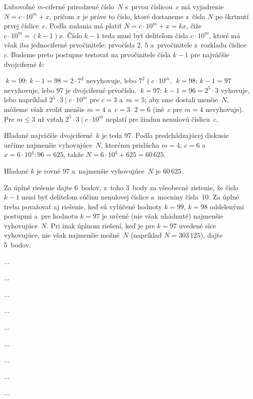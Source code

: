 {%
Ľubovoľné $m$-ciferné prirodzené číslo~$N$ s~prvou číslicou~$c$
má vyjadrenie $N=c\cdot10^m+x$, pričom $x$ je práve to číslo, ktoré
dostaneme z~čísla $N$ po škrtnutí prvej číslice~$c$.
Podľa zadania má platiť
$N=c\cdot10^m+x=kx$, čiže $c\cdot10^m=(k-1)x$. Číslo $k-1$
teda musí byť deliteľom čísla $c\cdot10^m$,
ktoré má však iba jednociferné prvočinitele: prvočísla
2, 5 a~prvočinitele z~rozkladu číslice~$c$.
Budeme preto postupne testovať na prvočinitele čísla $k-1$ pre
najväčšie dvojciferné $k$:

$k=99$: $k-1=98=2\cdot7^2$ nevyhovuje, lebo
 $7^2\nmid c\cdot10^m$.
$k=98$: $k-1=97$ nevyhovuje,
 lebo $97$ je dvojciferné prvočíslo.
$k=97$: $k-1=96=2^5\cdot3$ vyhovuje, lebo napríklad
 $2^5\cdot3\mid c\cdot10^m$ pre $c=3$ a~$m=5$; aby sme dostali
menšie~$N$, môžeme však zvoliť menšie $m=4$ a~$c=3\cdot2=6$
(iné~$c$ pre $m=4$ nevyhovuje). Pre $m\le3$ už vzťah
$2^5\cdot3\mid c\cdot10^m$ neplatí pre žiadnu nenulovú číslicu~$c$.

Hľadané najväčšie dvojciferné~$k$ je teda $97$. Podľa predchádzajúcej
diskusie určíme najmenšie vyhovujúce~$N$, ktorému prislúcha $m=4$,
$c=6$ a~$x=6\cdot10^{4}:96=625$, takže $N=6\cdot10^4+625=60\,625$.

\odpoved
Hľadané $k$ je rovné $97$ a~najmenšie vyhovujúce~$N$ je $60\,625$.

\nobreak\medskip\petit\noindent
Za úplné riešenie dajte 6~bodov, z~toho
3~body za všeobecné zistenie,
že číslo $k-1$ musí byť deliteľom súčinu nenulovej číslice
a~mocniny čísla~10. Za úplné treba považovať
aj riešenie, keď sú vylúčené hodnoty $k=99$, $k=98$ oddelenými
postupmi a~pre hodnotu $k=97$ je určené (nie však uhádnuté)
najmenšie vyhovujúce~$N$. Pri inak úplnom riešení,
keď je pre $k=97$ uvedené síce vyhovujúce,
nie však najmenšie možné~$N$ (napríklad $N=303\,125$), dajte
5~bodov.
\endpetit
\bigbreak
}

{%
...}

{%
...}

{%
...}

{%
...}

{%
...}

{%
...}

{%
...}

{%
...}

{%
...}

